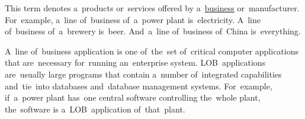 This term denotes a~products or~services offered by a~\hyperref[business]{business} or~manufacturer.
For~example, a~line of~business of~a~power plant is~electricity.
A~line of~business of~a~brewery is~beer.
And~a~line of~business of~China is~everything.

A~line of~business application is one of~the~set of~critical computer applications that are~necessary for~running an~enterprise system.
LOB~applications are~usually large programs that contain a~number of~integrated capabilities and~tie~into databases and~database management systems.
For~example, if~a~power plant has~one central software controlling the~whole plant, the~software is a~LOB~application of~that~plant.
